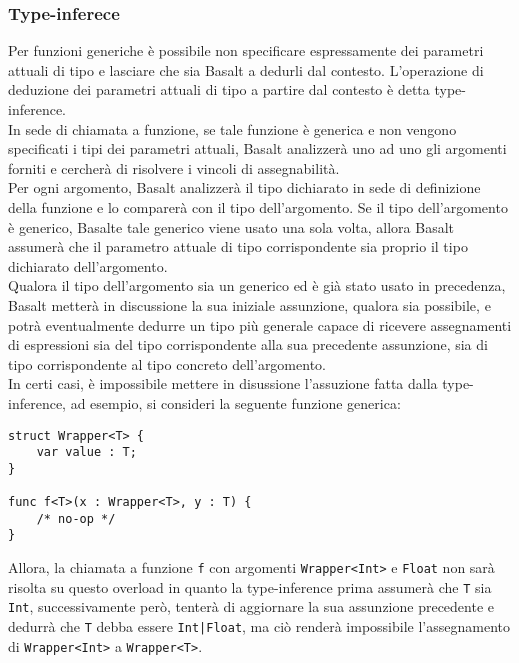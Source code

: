 \subsubsection{Type-inferece}
Per funzioni generiche è possibile non specificare espressamente dei parametri 
attuali di tipo e lasciare che sia Basalt a dedurli dal contesto. 
L’operazione di deduzione dei parametri attuali di tipo a partire dal 
contesto è detta type-inference. \\

In sede di chiamata a funzione, se tale funzione è generica e non vengono specificati
i tipi dei parametri attuali, Basalt analizzerà uno ad uno gli argomenti forniti e cercherà 
di risolvere i vincoli di assegnabilità. \\

Per ogni argomento, Basalt analizzerà il tipo dichiarato in sede di definizione della funzione e 
lo comparerà con il tipo dell'argomento. Se il tipo dell'argomento è generico, Basalte tale generico 
viene usato una sola volta, allora Basalt assumerà che il parametro attuale di tipo corrispondente sia 
proprio il tipo dichiarato dell'argomento. \\

Qualora il tipo dell'argomento sia un generico ed è già stato usato in precedenza, Basalt metterà in discussione
la sua iniziale assunzione, qualora sia possibile, e potrà eventualmente dedurre un tipo più generale capace di ricevere assegnamenti di 
espressioni sia del tipo corrispondente alla sua precedente assunzione, sia di tipo corrispondente al tipo concreto 
dell'argomento. \\

In certi casi, è impossibile mettere in disussione l'assuzione fatta dalla type-inference, ad esempio, si consideri 
la seguente funzione generica:

\vspace{0.5cm}
\begin{lstlisting}[frame=single]
struct Wrapper<T> {
    var value : T;
}

func f<T>(x : Wrapper<T>, y : T) { 
    /* no-op */ 
}
\end{lstlisting}
\vspace{0.5cm}

Allora, la chiamata a funzione \texttt{f} con argomenti \texttt{Wrapper<Int>} e \texttt{Float} non sarà 
risolta su questo overload in quanto la type-inference prima assumerà che \texttt{T} sia \texttt{Int}, successivamente 
però, tenterà di aggiornare la sua assunzione precedente e dedurrà che \texttt{T} debba essere \texttt{Int|Float},
ma ciò renderà impossibile l'assegnamento di \texttt{Wrapper<Int>} a \texttt{Wrapper<T>}. \\

